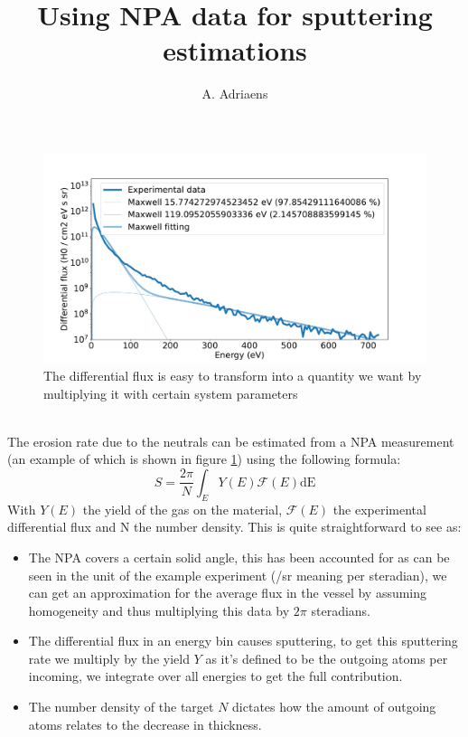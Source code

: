 \documentclass{article}
\title{Using NPA data for sputtering estimations}
\author[1,2]{A. Adriaens}
\affil[1]{Laboratory for Plasma Physics LPP-ERM/KMS, Brussels, Belgium}
\affil[2]{Department of Applied Physics, Ghent University, Belgium}
\date{}
\begin{document}
\maketitle

\noindent
\begin{figure}[ht]
    \includegraphics[width=\textwidth]{figures/NPA_example.pdf}
    \caption{The differential flux is easy to transform into a quantity we want by multiplying it with certain system parameters}
    \label{fig:examplemeasurement}
\end{figure}\\
The erosion rate due to the neutrals can be estimated from a NPA
measurement (an example of which is shown in figure
\ref{fig:examplemeasurement}) using the following formula:
\begin{equation}
    S = \frac{2\pi}{N} \int_E Y(E)\mathcal{F} (E) \text{dE}
    \label{eqn:ErosionRateFormal}
\end{equation}
With $Y(E)$ the yield of the gas on the material, $\mathcal{F}(E)$ the 
experimental differential flux and N the number density.
This is quite straightforward to see as:
\begin{itemize}
    \item The NPA covers a certain solid angle, this has been accounted for as
        can be seen in the unit of the example experiment (/sr meaning per
        steradian), we can get an approximation for the average
        flux in the vessel by assuming homogeneity and thus multiplying this
data by $2\pi$ steradians. 
    \item The differential flux in an energy bin causes sputtering, to get this
        sputtering rate we multiply by the yield $Y$ as it's defined to be the
        outgoing atoms per incoming, we integrate over all energies to get the
        full contribution. 
    \item The number density of the target $N$ dictates how the amount of
        outgoing atoms relates to the decrease in thickness.
\end{itemize}
\end{document}
